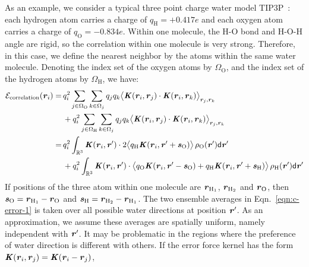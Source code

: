 \documentclass[aps,pre,preprint]{revtex4}
\renewcommand{\v}[1]{\textbf{\textit{#1}}}
\renewcommand{\d}[1]{\textsf{#1}}
\begin{document}
As an example, we consider a typical three point charge water model
TIP3P~\cite{jorgensen1983comparison}: each hydrogen atom carries a
charge of $q_{\textrm{H}} = +0.417e$ and each oxygen atom carries a
charge of $q_{\textrm{O}} = -0.834e$. Within one molecule, the H-O
bond and H-O-H angle are rigid, so the correlation within one molecule
is very strong.  Therefore, in this case, we define the nearest neighbor by the
atoms within the same water molecule.  Denoting the index set of the oxygen
atoms by $\Omega_{\textrm{O}}$, and the index set of the hydrogen
atoms by $\Omega_{\textrm{H}}$, we have:
\begin{align}\nonumber
  \mathcal E_{\textrm{correlation}}(\v r_i)
  = &\,
  q_i^2\sum_{j\in\Omega_{\textrm{O}}}\sum_{k\in\Omega_j}q_jq_k
  \big\langle
  \v K(\v r_i , \v r_j)\cdot\v K(\v r_i , \v r_k)
  \big\rangle_{\v r_j,\v r_k} \\ \nonumber
  &\,+ 
  q_i^2\sum_{j\in\Omega_{\textrm{H}}}\sum_{k\in\Omega_j}q_jq_k
  \big\langle
  \v K(\v r_i , \v r_j)\cdot\v K(\v r_i , \v r_k)
  \big\rangle_{\v r_j,\v r_k} \\\nonumber
  = &\,
  q_i^2
  \int_{\mathbb R^3}
  \v K(\v r_i , \v r')\cdot
  2\big\langle
  q_{\textrm{H}}\v K(\v r_i , \v r' + \v s_{\textrm{O}})
  \big\rangle\,
  \rho_{\textrm{O}}(\v r')
  \d d\v r' \\\label{eqn:c-error-1}
  & \,+
  q_i^2
  \int_{\mathbb R^3}
  \v K(\v r_i , \v r')\cdot
  \big\langle
  q_{\textrm{O}}\v K(\v r_i , \v r' - \v s_{\textrm{O}})+
  q_{\textrm{H}}\v K(\v r_i , \v r' + \v s_{\textrm{H}})
  \big\rangle\,\rho_{\textrm{H}}(\v r')
  \d d\v r'
\end{align}
If positions of the three atom within one molecule are
$\v r_{\textrm{H}_1}$, $\v r_{\textrm{H}_2}$ and $\v r_{\textrm{O}}$, then
$\v s_{\textrm{O}} = \v r_{\textrm{H}_1} - \v r_{\textrm{O}}$ and
$\v s_{\textrm{H}} = \v r_{\textrm{H}_2} - \v r_{\textrm{H}_1}$.
The two ensemble averages in Eqn.~\eqref{eqn:c-error-1}
is taken over all possible water directions 
at position $\v r'$. As an approximation, we
assume these averages are  spatially uniform, namely independent with $\v r'$.
It may be  problematic
in the regions where the preference of water  direction is different
with others.
If the error force kernel
has the form $\v K(\v r_i , \v r_j) = \v K(\v r_i - \v r_j)$, 
\end{document}

